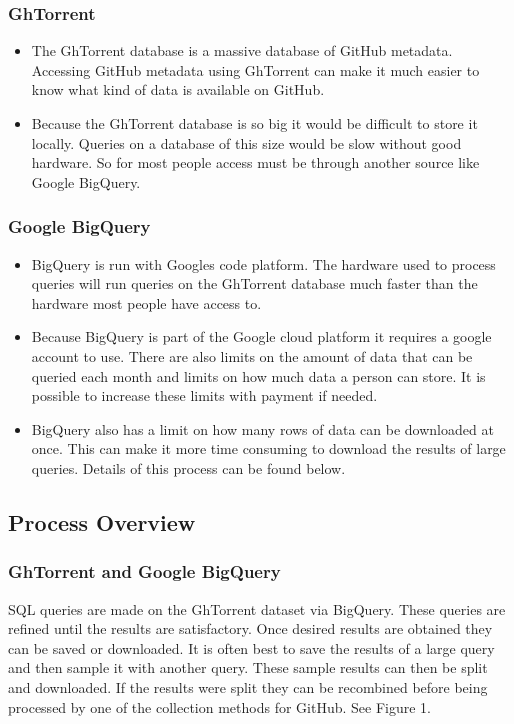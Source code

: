 \documentclass{article}
\begin{document}
\subsubsection*{GhTorrent}
\begin{itemize}
    \item The GhTorrent database is a massive database of GitHub metadata. Accessing GitHub metadata using GhTorrent can make it much easier to know what kind of data is available on GitHub.
    
    \item Because the GhTorrent database is so big it would be difficult to store it locally. Queries on a database of this size would be slow without good hardware. So for most people access must be through another source like Google BigQuery. 
\end{itemize}

\subsubsection*{Google BigQuery}
\begin{itemize}
    \item BigQuery is run with Googles code platform. The hardware used to process queries will run queries on the GhTorrent database much faster than the hardware most people have access to.

    \item Because BigQuery is part of the Google cloud platform it requires a google account to use. There are also limits on the amount of data that can be queried each month and limits on how much data a person can store. It is possible to increase these limits with payment if needed.

    \item BigQuery also has a limit on how many rows of data can be downloaded at once. This can make it more time consuming to download the results of large queries. Details of this process can be found below.
\end{itemize}


\subsection{Process Overview}

\subsubsection*{GhTorrent and Google BigQuery}
SQL queries are made on the GhTorrent dataset via BigQuery. These queries are refined until the results are satisfactory. Once desired results are obtained they can be saved or downloaded. It is often best to save the results of a large query and then sample it with another query. These sample results can then be split and downloaded. If the results were split they can be recombined before being processed by one of the collection methods for GitHub. See Figure 1.
\end{document}
